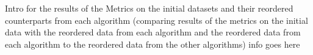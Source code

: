 \documentclass[../../ClusteringConnectionsMAIN.tex]{subfiles}
\begin{document}
\begin{flushleft}
\begin{large}

Intro for the results of the Metrics on the initial datasets and their reordered counterparts from each algorithm (comparing results of the metrics on the initial data with the reordered data from each algorithm and the reordered data from each algorithm to the reordered data from the other algorithms) info goes here


\end{large}
\end{flushleft}
\end{document}
